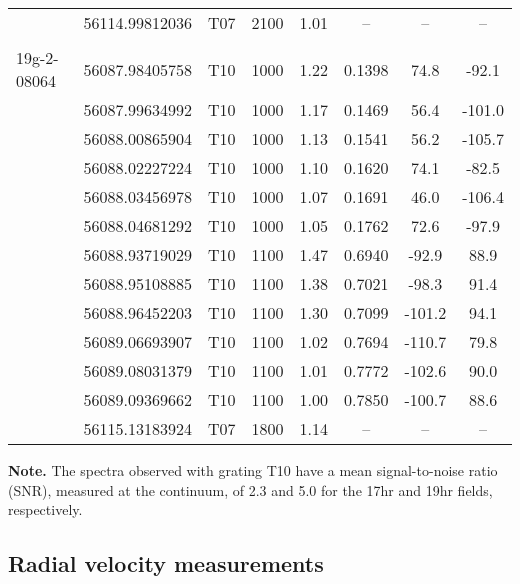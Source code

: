 \documentclass[fleqn,usenatbib]{mnras}
\begin{document}
\begin{center}
\begin{longtable}{lccccccc}
			& 56114.99812036 & T07 & 2100  & 1.01  & -- & -- & -- \\ %
\\  [-2ex]
19g-2-08064	& 56087.98405758 & T10 & 1000  & 1.22  & 0.1398 & 74.8 & -92.1 \\ %
			& 56087.99634992 & T10 & 1000  & 1.17  & 0.1469 & 56.4 & -101.0 \\ %
			& 56088.00865904 & T10 & 1000  & 1.13  & 0.1541 & 56.2 & -105.7 \\ %
			& 56088.02227224 & T10 & 1000  & 1.10  & 0.1620 & 74.1 & -82.5 \\ %
            & 56088.03456978 & T10 & 1000  & 1.07  & 0.1691 & 46.0 & -106.4 \\ %
			& 56088.04681292 & T10 & 1000  & 1.05  & 0.1762 & 72.6 & -97.9 \\ %
			& 56088.93719029 & T10 & 1100  & 1.47  & 0.6940 & -92.9 & 88.9 \\ %
			& 56088.95108885 & T10 & 1100  & 1.38  & 0.7021 & -98.3 & 91.4 \\ %
			& 56088.96452203 & T10 & 1100  & 1.30  & 0.7099 & -101.2 & 94.1 \\ %
			& 56089.06693907 & T10 & 1100  & 1.02  & 0.7694 & -110.7 & 79.8 \\ %
			& 56089.08031379 & T10 & 1100  & 1.01  & 0.7772 & -102.6 & 90.0 \\ %
			& 56089.09369662 & T10 & 1100  & 1.00  & 0.7850 & -100.7 & 88.6 \\ %
			& 56115.13183924 & T07 & 1800  & 1.14  & -- & -- & -- \\ %

\hline %
\end{longtable}
\begin{list}{}{}
\item[]{\footnotesize{ {\bf Note.} The spectra observed with grating T10 have a mean signal-to-noise ratio (SNR), measured at the continuum, of 2.3 and 5.0 for the 17hr and 19hr fields, respectively.}}
\end{list}
\twocolumn
\end{center}



\subsection{Radial velocity measurements}
\end{document}
